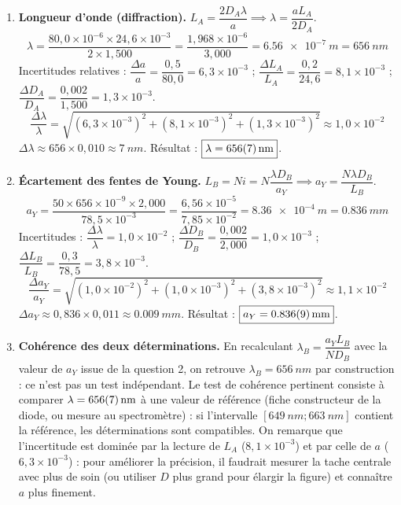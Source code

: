 \documentclass[11pt]{article}
\begin{document}
\begin{corrige}
\begin{enumerate}
    \item \textbf{Longueur d'onde (diffraction).} $L_A = \dfrac{2D_A\lambda}{a} \implies \boxed{\lambda = \dfrac{a L_A}{2 D_A}}$.
    \[ \lambda = \frac{80,0\times10^{-6} \times 24,6\times10^{-3}}{2 \times 1,500} = \frac{1,968\times10^{-6}}{3,000} = \SI{6,56e-7}{m} = \SI{656}{nm} \]
    Incertitudes relatives : $\dfrac{\Delta a}{a} = \dfrac{0,5}{80,0} = 6,3\times10^{-3}$ ; $\dfrac{\Delta L_A}{L_A} = \dfrac{0,2}{24,6} = 8,1\times10^{-3}$ ; $\dfrac{\Delta D_A}{D_A} = \dfrac{0,002}{1,500} = 1,3\times10^{-3}$.
    \[ \frac{\Delta \lambda}{\lambda} = \sqrt{(6,3\times10^{-3})^2 + (8,1\times10^{-3})^2 + (1,3\times10^{-3})^2} \approx 1,0\times10^{-2} \]
    $\Delta\lambda \approx 656 \times 0,010 \approx \SI{7}{nm}$. Résultat : $\boxed{\lambda = \SI{656 \pm 7}{nm}}$.
    \item \textbf{Écartement des fentes de Young.} $L_B = N i = N\dfrac{\lambda D_B}{a_Y} \implies \boxed{a_Y = \dfrac{N\lambda D_B}{L_B}}$.
    \[ a_Y = \frac{50 \times 656\times10^{-9} \times 2,000}{78,5\times10^{-3}} = \frac{6,56\times10^{-5}}{7,85\times10^{-2}} = \SI{8,36e-4}{m} = \SI{0,836}{mm} \]
    Incertitudes : $\dfrac{\Delta\lambda}{\lambda} = 1,0\times10^{-2}$ ; $\dfrac{\Delta D_B}{D_B} = \dfrac{0,002}{2,000} = 1,0\times10^{-3}$ ; $\dfrac{\Delta L_B}{L_B} = \dfrac{0,3}{78,5} = 3,8\times10^{-3}$.
    \[ \frac{\Delta a_Y}{a_Y} = \sqrt{(1,0\times10^{-2})^2 + (1,0\times10^{-3})^2 + (3,8\times10^{-3})^2} \approx 1,1\times10^{-2} \]
    $\Delta a_Y \approx 0,836 \times 0,011 \approx \SI{0,009}{mm}$. Résultat : $\boxed{a_Y = \SI{0,836 \pm 0,009}{mm}}$.
    \item \textbf{Cohérence des deux déterminations.} En recalculant $\lambda_B = \dfrac{a_Y L_B}{N D_B}$ avec la valeur de $a_Y$ issue de la question 2, on retrouve $\lambda_B = \SI{656}{nm}$ par construction : ce n'est pas un test indépendant. Le test de cohérence pertinent consiste à comparer $\lambda = \SI{656 \pm 7}{nm}$ à une valeur de référence (fiche constructeur de la diode, ou mesure au spectromètre) : si l'intervalle $[\SI{649}{nm} ; \SI{663}{nm}]$ contient la référence, les déterminations sont compatibles. On remarque que l'incertitude est dominée par la lecture de $L_A$ ($8,1\times10^{-3}$) et par celle de $a$ ($6,3\times10^{-3}$) : pour améliorer la précision, il faudrait mesurer la tache centrale avec plus de soin (ou utiliser $D$ plus grand pour élargir la figure) et connaître $a$ plus finement.

\end{enumerate}
\end{corrige}
\end{document}
